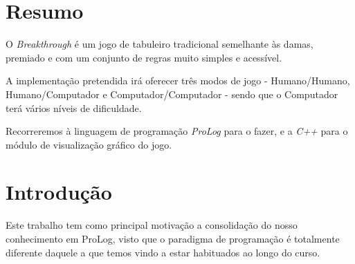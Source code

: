\documentclass[15pt,a4paper]{article}
\begin{document}


\section*{Resumo}




O \textit{Breakthrough} é um jogo de tabuleiro tradicional semelhante às damas, premiado e com um conjunto de regras muito simples e acessível.

A implementação pretendida irá oferecer três modos de jogo - Humano/Humano, Humano/Computador e Computador/Computador - sendo que o Computador terá vários níveis
de dificuldade.

Recorreremos à linguagem de programação \textit{ProLog} para o fazer, e a \textit{C++}  para o módulo de visualização gráfico do jogo.


\tableofcontents


\newpage


\section{Introdução}




Este trabalho tem como principal motivação a consolidação do nosso conhecimento em ProLog, visto que o paradigma de programação é totalmente diferente daquele a que temos vindo a estar habituados ao longo do curso.
\end{document}
